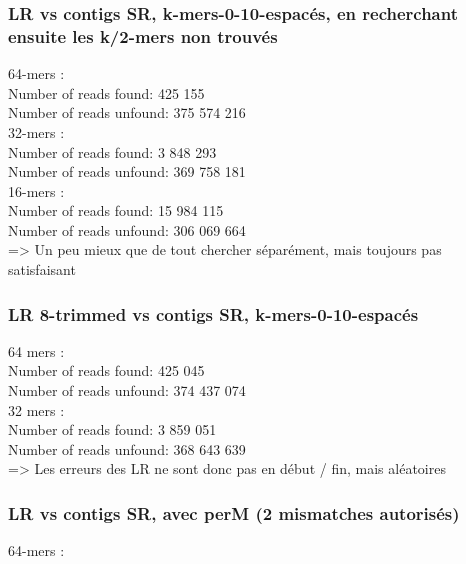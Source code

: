 \documentclass[12pt]{article}
\begin{document}
\subsubsection{LR vs contigs SR, k-mers-0-10-espacés, en recherchant ensuite les k/2-mers non trouvés}

64-mers : \\

Number of reads found: 425 155 \\
Number of reads unfound: 375 574 216 \\

32-mers : \\

Number of reads found: 3 848 293 \\
Number of reads unfound: 369 758 181 \\

16-mers : \\

Number of reads found: 15 984 115 \\
Number of reads unfound: 306 069 664 \\

=> Un peu mieux que de tout chercher séparément, mais toujours pas satisfaisant 

\subsubsection{LR 8-trimmed vs contigs SR, k-mers-0-10-espacés}

64 mers : \\

Number of reads found: 425 045 \\
Number of reads unfound: 374 437 074 \\

32 mers : \\

Number of reads found: 3 859 051 \\
Number of reads unfound: 368 643 639 \\

=> Les erreurs des LR ne sont donc pas en début / fin, mais aléatoires

\subsubsection{LR vs contigs SR, avec perM (2 mismatches autorisés)}

64-mers : \\
\end{document}
